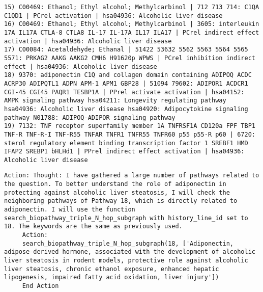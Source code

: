 \begin{lstlisting}[style=QuestionType]
15) C00469: Ethanol; Ethyl alcohol; Methylcarbinol | 712 713 714: C1QA C1QD1 | PCrel activation | hsa04936: Alcoholic liver disease
16) C00469: Ethanol; Ethyl alcohol; Methylcarbinol | 3605: interleukin 17A IL17A CTLA-8 CTLA8 IL-17 IL-17A IL17 ILA17 | PCrel indirect effect activation | hsa04936: Alcoholic liver disease
17) C00084: Acetaldehyde; Ethanal | 51422 53632 5562 5563 5564 5565 5571: PRKAG2 AAKG AAKG2 CMH6 H91620p WPWS | PCrel inhibition indirect effect | hsa04936: Alcoholic liver disease
18) 9370: adiponectin C1Q and collagen domain containing ADIPOQ ACDC ACRP30 ADIPQTL1 ADPN APM-1 APM1 GBP28 | 51094 79602: ADIPOR1 ACDCR1 CGI-45 CGI45 PAQR1 TESBP1A | PPrel activate activation | hsa04152: AMPK signaling pathway hsa04211: Longevity regulating pathway hsa04936: Alcoholic liver disease hsa04920: Adipocytokine signaling pathway N01788: ADIPOQ-ADIPOR signaling pathway
19) 7132: TNF receptor superfamily member 1A TNFRSF1A CD120a FPF TBP1 TNF-R TNF-R-I TNF-R55 TNFAR TNFR1 TNFR55 TNFR60 p55 p55-R p60 | 6720: sterol regulatory element binding transcription factor 1 SREBF1 HMD IFAP2 SREBP1 bHLHd1 | PPrel indirect effect activation | hsa04936: Alcoholic liver disease
\end{lstlisting}
\begin{lstlisting}[style=AnswerType]
Action: Thought: I have gathered a large number of pathways related to the question. To better understand the role of adiponectin in protecting against alcoholic liver steatosis, I will check the neighboring pathways of Pathway 18, which is directly related to adiponectin. I will use the function search_biopathway_triple_N_hop_subgraph with history_line_id set to 18. The keywords are the same as previously used.
     Action:
     search_biopathway_triple_N_hop_subgraph(18, ['Adiponectin, adipose-derived hormone, associated with the development of alcoholic liver steatosis in rodent models, protective role against alcoholic liver steatosis, chronic ethanol exposure, enhanced hepatic lipogenesis, impaired fatty acid oxidation, liver injury'])
     End Action
\end{lstlisting}
